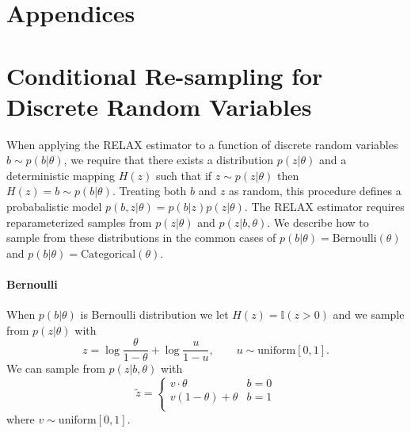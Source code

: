 \documentclass{article}
\begin{document}





\clearpage
\section*{Appendices}
\appendix

\section{Conditional Re-sampling for Discrete Random Variables}
\label{resample}
When applying the RELAX estimator to a function of discrete random variables $b \sim p(b|\theta)$, we require that there exists a distribution $p(z|\theta)$ and a deterministic mapping $H(z)$ such that if $z \sim p(z|\theta)$ then $H(z) = b \sim p(b|\theta)$. Treating both $b$ and $z$ as random, this procedure defines a probabalistic model $p(b, z | \theta) = p(b|z)p(z|\theta)$. The RELAX estimator requires reparameterized samples from $p(z|\theta)$ and $p(z|b,\theta)$. We describe how to sample from these distributions in the common cases of $p(b|\theta) = \text{Bernoulli}(\theta)$ and $p(b|\theta) = \text{Categorical}(\theta)$.

\paragraph{Bernoulli} When $p(b|\theta)$ is Bernoulli distribution we let $H(z) = \mathbb{I}(z>0)$ and we sample from $p(z|\theta)$ with 
$$ z = \log \frac{\theta}{1 - \theta} + \log \frac{u}{1-u}, \qquad u \sim \text{uniform}[0,1].
$$ 
We can sample from $p(z|b, \theta)$ with 
\[
\tilde{z} =    \left\{
\begin{array}{ll}
      v\cdot\theta & b = 0 \\
      v(1-\theta) + \theta & b = 1 \\
\end{array} 
\right.
\]
where $v \sim \text{uniform}[0, 1]$.
\end{document}
